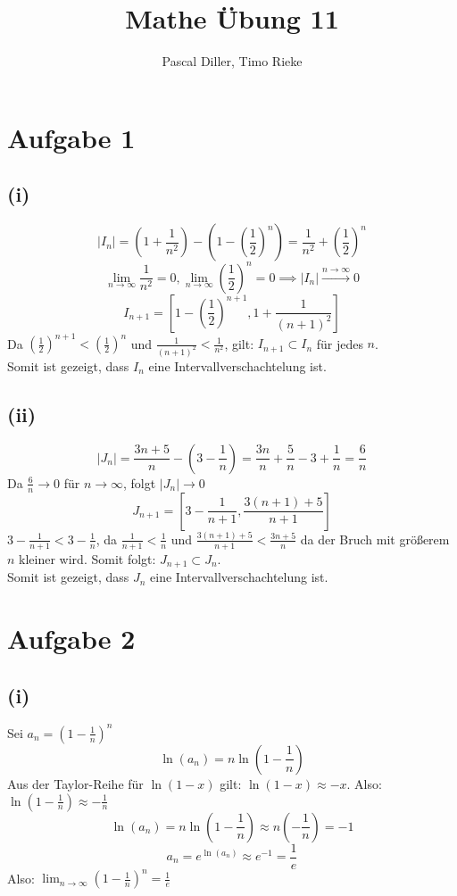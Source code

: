 \documentclass{article}
\title{Mathe Übung 11}
\author{Pascal Diller, Timo Rieke}
\begin{document}
\setcounter{secnumdepth}{0}
\maketitle

\section*{Aufgabe 1}
\subsection*{(i)}
\[|I_n| = \left(1 + \frac{1}{n^2}\right) - \left(1- \left(\frac{1}{2}\right)^n\right) = \frac{1}{n^2} + \left(\frac{1}{2}\right)^n\]
\[\lim_{n\to\infty} \frac{1}{n^2} = 0, \lim_{n\to\infty} \left(\frac{1}{2}\right)^n = 0 \implies |I_n| \xrightarrow{n\to\infty} 0\]
\[I_{n+1} = \left[ 1-\left(\frac{1}{2}\right)^{n+1}, 1 + \frac{1}{(n+1)^2} \right]\]
Da $\left(\frac{1}{2}\right)^{n+1} < \left(\frac{1}{2}\right)^n$ und $\frac{1}{(n+1)^2} < \frac{1}{n^2}$, gilt: $I_{n+1} \subset I_n$ für jedes $n$. \\
Somit ist gezeigt, dass $I_n$ eine Intervallverschachtelung ist.
\subsection*{(ii)}
\[|J_n| = \frac{3n + 5}{n} - \left(3 - \frac{1}{n}\right) = \frac{3n}{n} + \frac{5}{n} - 3 + \frac{1}{n} = \frac{6}{n}\]
Da $\frac{6}{n} \to 0$ für $n \to \infty$, folgt $|J_n| \to 0$
\[J_{n+1} = \left[ 3 - \frac{1}{n+1}, \frac{3(n+1) + 5}{n+1} \right]\]
$3 - \frac{1}{n+1} < 3 - \frac{1}{n}$, da $\frac{1}{n+1} < \frac{1}{n}$ und $\frac{3(n+1) + 5}{n+1} < \frac{3n+5}{n}$ da der Bruch mit größerem $n$ kleiner wird. Somit folgt: $J_{n+1} \subset J_n$. \\
\newline
Somit ist gezeigt, dass $J_n$ eine Intervallverschachtelung ist.

\section*{Aufgabe 2}
\subsection*{(i)}
Sei $a_n = \left( 1 - \frac{1}{n} \right)^n$
\[\ln\left( a_n \right) = n \ln\left(1 - \frac{1}{n}\right)\]
Aus der Taylor-Reihe für $\ln(1-x)$ gilt: $\ln(1-x) \approx -x$. Also: $\ln\left(1 - \frac{1}{n}\right) \approx - \frac{1}{n}$
\[\ln(a_n) = n \ln\left(1-\frac{1}{n}\right) \approx n \left(-\frac{1}{n}\right) = -1\]
\[a_n = e^{\ln(a_n)} \approx e^{-1} = \frac{1}{e}\]
Also: $\lim_{n\to\infty} \left(1 - \frac{1}{n}\right)^n = \frac{1}{e}$
\end{document}
